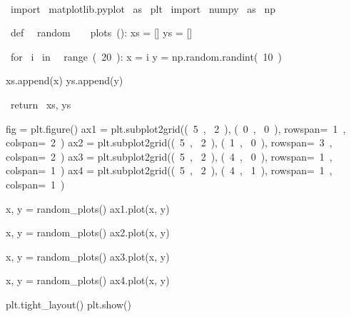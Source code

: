 \begin{paracol}{2}
\smallskip
\begin{cellExecute}[escapechar=~]
~~
\end{cellExecute}
\switchcolumn
\begin{codeCell}[escapechar=~]
~\textcolor{mtk17}{import}~ matplotlib.pyplot ~\textcolor{mtk17}{as}~ plt
~\textcolor{mtk17}{import}~ numpy ~\textcolor{mtk17}{as}~ np

~\textcolor{mtk6}{def}~ ~\textcolor{mtk13}{random}~~~~\textcolor{mtk13}{plots}~():
  xs = []
  ys = []
  
  ~\textcolor{mtk17}{for}~ i ~\textcolor{mtk6}{in}~ ~\textcolor{mtk13}{range}~(~\textcolor{mtk7}{20}~):
    x = i
    y = np.random.randint(~\textcolor{mtk7}{10}~)
    
    xs.append(x)
    ys.append(y)
  
  ~\textcolor{mtk17}{return}~ xs, ys

fig = plt.figure()
ax1 = plt.subplot2grid((~\textcolor{mtk7}{5}~, ~\textcolor{mtk7}{2}~), (~\textcolor{mtk7}{0}~, ~\textcolor{mtk7}{0}~), rowspan=~\textcolor{mtk7}{1}~, colspan=~\textcolor{mtk7}{2}~)
ax2 = plt.subplot2grid((~\textcolor{mtk7}{5}~, ~\textcolor{mtk7}{2}~), (~\textcolor{mtk7}{1}~, ~\textcolor{mtk7}{0}~), rowspan=~\textcolor{mtk7}{3}~, colspan=~\textcolor{mtk7}{2}~)
ax3 = plt.subplot2grid((~\textcolor{mtk7}{5}~, ~\textcolor{mtk7}{2}~), (~\textcolor{mtk7}{4}~, ~\textcolor{mtk7}{0}~), rowspan=~\textcolor{mtk7}{1}~, colspan=~\textcolor{mtk7}{1}~)
ax4 = plt.subplot2grid((~\textcolor{mtk7}{5}~, ~\textcolor{mtk7}{2}~), (~\textcolor{mtk7}{4}~, ~\textcolor{mtk7}{1}~), rowspan=~\textcolor{mtk7}{1}~, colspan=~\textcolor{mtk7}{1}~)

x, y = random_plots()
ax1.plot(x, y)

x, y = random_plots()
ax2.plot(x, y)

x, y = random_plots()
ax3.plot(x, y)

x, y = random_plots()
ax4.plot(x, y)

plt.tight_layout()
plt.show()
\end{codeCell}
\end{paracol}

\begin{paracol}{2}
\begin{cellExecute}[escapechar=~]
~~
\end{cellExecute}
\switchcolumn
\begin{resultCell}[escapechar=~]
\end{resultCell}
\end{paracol}

